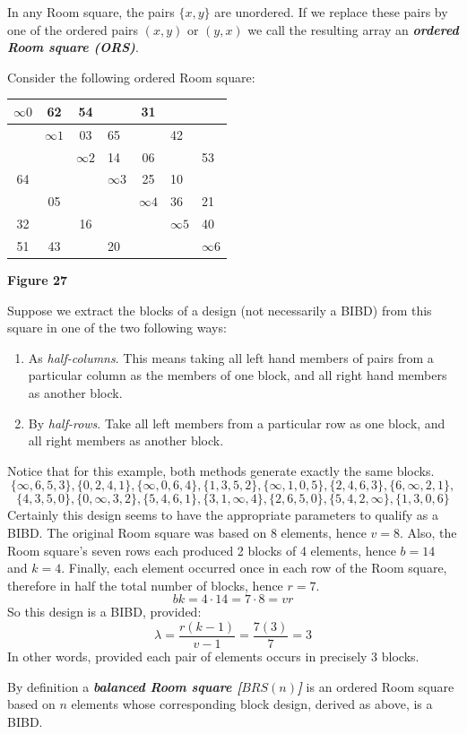 \documentclass[
  12pt,
  a4paper]{book}
\begin{document}
In any Room square, the pairs \(\{x,y\}\) are unordered. If we replace
these pairs by one of the ordered pairs \((x,y)\) or \((y,x)\) we call
the resulting array an \textbf{\emph{ordered Room square (ORS)}}.

Consider the following ordered Room square:

\begin{longtable}[]{@{}ccclcll@{}}
\toprule
\(\infty 0\) & 62 & 54 & & 31 & &\tabularnewline
\midrule
\endhead
& \(\infty 1\) & 03 & 65 & & 42 &\tabularnewline
& & \(\infty 2\) & 14 & 06 & & 53\tabularnewline
64 & & & \(\infty 3\) & 25 & 10 &\tabularnewline
& 05 & & & \(\infty 4\) & 36 & 21\tabularnewline
32 & & 16 & & & \(\infty 5\) & 40\tabularnewline
51 & 43 & & 20 & & & \(\infty 6\)\tabularnewline
\bottomrule
\end{longtable}

\textbf{Figure 27}

Suppose we extract the blocks of a design (not necessarily a BIBD) from
this square in one of the two following ways:

\begin{enumerate}
\def\labelenumi{\arabic{enumi}.}
\item
  As \emph{half-columns}. This means taking all left hand members of
  pairs from a particular column as the members of one block, and all
  right hand members as another block.
\item
  By \emph{half-rows}. Take all left members from a particular row as
  one block, and all right members as another block.
\end{enumerate}

Notice that for this example, both methods generate exactly the same
blocks.
\[\{\infty,6,5,3\},\{0,2,4,1\},\{\infty,0,6,4\},\{1,3,5,2\},\{\infty,1,0,5\},\{2,4,6,3\},\{6, \infty,2,1\},\]
\[\{4,3,5,0\},\{0,\infty,3,2\},\{5,4,6,1\},\{3,1,\infty,4\},\{2,6,5,0\},\{5,4,2,\infty\},\{1, 3,0,6\}\]
Certainly this design seems to have the appropriate parameters to
qualify as a BIBD. The original Room square was based on 8 elements,
hence \(v=8\). Also, the Room square's seven rows each produced 2 blocks
of 4 elements, hence \(b=14\) and \(k=4\). Finally, each element
occurred once in each row of the Room square, therefore in half the
total number of blocks, hence \(r=7\). \[bk=4\cdot 14 = 7 \cdot 8 = vr\]
So this design is a BIBD, provided:
\[\lambda = \frac{r(k-1)}{v-1} = \frac{7(3)}{7}=3\] In other words,
provided each pair of elements occurs in precisely 3 blocks.

By definition a \textbf{\emph{balanced Room square {[}\(BRS(n)\){]}}} is
an ordered Room square based on \(n\) elements whose corresponding block
design, derived as above, is a BIBD.
\end{document}
